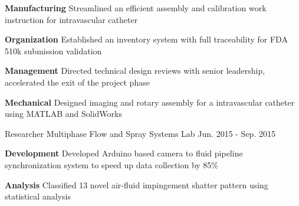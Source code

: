 \begin{cventries}
{\begin{cvitems}
{				\textbf{Manufacturing} Streamlined an efficient assembly and calibration work instruction for intravascular catheter}
			\item {
				\textbf{Organization} Established an inventory system with full traceability for FDA 510k submission validation}
			\item {
				\textbf{Management} Directed technical design reviews with senior leadership, accelerated the exit of the project phase}
			\item {
				\textbf{Mechanical} Designed imaging and rotary assembly for a intravascular catheter using MATLAB and SolidWorks
			}
		\end{cvitems}
	}
	\cventry
	{Researcher}
	{Multiphase Flow and Spray Systems Lab} 
	{Jun. 2015 - Sep. 2015}
	{}
	{
		\begin{cvitems}
			\item {
				\textbf{Development} Developed Arduino based camera to fluid pipeline synchronization system to speed up data collection by 85\%
			}
			\item {
				\textbf{Analysis} Classified 13 novel air-fluid impingement shatter pattern using statistical analysis}
		\end{cvitems}
	}  
\end{cventries}
